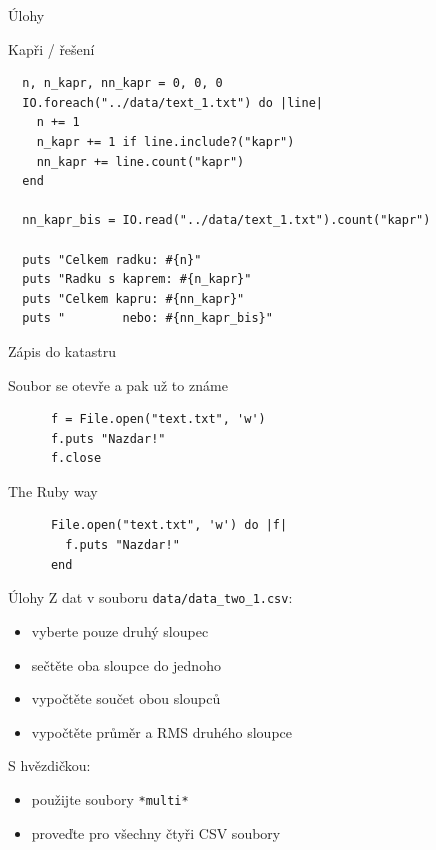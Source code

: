 \documentclass{beamer}
\begin{document}
\begin{frame}[fragile]{Úlohy}
  \begin{block}{Kapři / řešení}
    \scriptsize
\begin{verbatim}
  n, n_kapr, nn_kapr = 0, 0, 0
  IO.foreach("../data/text_1.txt") do |line|
    n += 1
    n_kapr += 1 if line.include?("kapr")
    nn_kapr += line.count("kapr")
  end

  nn_kapr_bis = IO.read("../data/text_1.txt").count("kapr")

  puts "Celkem radku: #{n}"
  puts "Radku s kaprem: #{n_kapr}"
  puts "Celkem kapru: #{nn_kapr}"
  puts "        nebo: #{nn_kapr_bis}"
\end{verbatim}
  \end{block}
\end{frame}

\begin{frame}[fragile]{Zápis do katastru}
  \begin{block}{Soubor se otevře a pak už to známe}
    \begin{verbatim}
      f = File.open("text.txt", 'w')
      f.puts "Nazdar!"
      f.close
    \end{verbatim}
  \end{block}
  \pause
  \begin{block}{The Ruby way}
    \begin{verbatim}
      File.open("text.txt", 'w') do |f|
        f.puts "Nazdar!"
      end
    \end{verbatim}
  \end{block}
\end{frame}

\begin{frame}{Úlohy}
  Z dat v souboru \texttt{data/data\_two\_1.csv}:
  \begin{itemize}
    \item vyberte pouze druhý sloupec
    \item sečtěte oba sloupce do jednoho
    \item vypočtěte součet obou sloupců
    \item vypočtěte průměr a RMS druhého sloupce
  \end{itemize}
  S hvězdičkou:
  \begin{itemize}
    \item použijte soubory \texttt{*multi*}
    \item proveďte pro všechny čtyři CSV soubory
  \end{itemize}
\end{frame}
\end{document}
